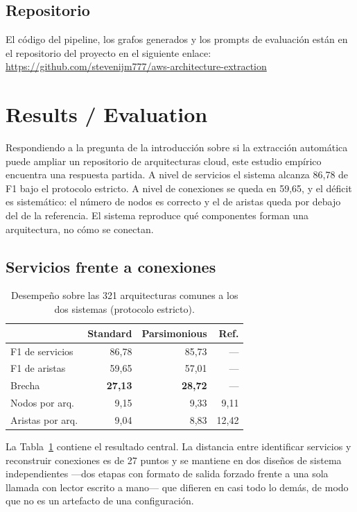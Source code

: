 \documentclass[a4paper, twocolumn, 10pt]{IEEEtran}
\begin{document}
\subsection{Repositorio}
El código del pipeline, los grafos generados y los prompts de evaluación están en el repositorio del proyecto en el siguiente enlace:
\url{https://github.com/stevenijm777/aws-architecture-extraction}
 
\section{Results / Evaluation}

Respondiendo a la pregunta de la introducción sobre si la extracción automática puede ampliar un repositorio de arquitecturas cloud, este estudio empírico encuentra una respuesta partida. A nivel de servicios el sistema alcanza 86,78 de F1 bajo el protocolo estricto. A nivel de conexiones se queda en 59,65, y el déficit es sistemático: el número de nodos es correcto y el de aristas queda por debajo del de la referencia. El sistema reproduce qué componentes forman una arquitectura, no cómo se conectan.

\subsection{Servicios frente a conexiones}
\label{sec:rq1}

\begin{table}[H]
\centering\small
\caption{Desempeño sobre las 321 arquitecturas comunes a los dos sistemas
(protocolo estricto).}
\label{tab:rq1}
\begin{tabular}{lrrr}
\toprule
 & Standard & Parsimonious & Ref.\\
\midrule
F1 de servicios & 86,78 & 85,73 & ---\\
F1 de aristas   & 59,65 & 57,01 & ---\\
Brecha          & \textbf{27,13} & \textbf{28,72} & ---\\
\midrule
Nodos por arq.   & 9,15 & 9,33 & 9,11\\
Aristas por arq. & 9,04 & 8,83 & 12,42\\
\bottomrule
\end{tabular}
\end{table}

La Tabla~\ref{tab:rq1} contiene el resultado central. La distancia entre
identificar servicios y reconstruir conexiones es de 27 puntos y se
mantiene en dos diseños de sistema independientes —dos etapas con formato
de salida forzado frente a una sola llamada con lector escrito a mano—
que difieren en casi todo lo demás, de modo que no es un artefacto de una
configuración.
\end{document}
